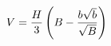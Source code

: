 \documentclass[preview]{standalone}
\begin{document}
\begin{align*}
\special{dvisvgm:raw <g id='unique000'>}V=\frac{H}{3}\left(B-\frac{b\sqrt{b}}{\sqrt{B}}\right)\special{dvisvgm:raw </g>}
\end{align*}
\end{document}
